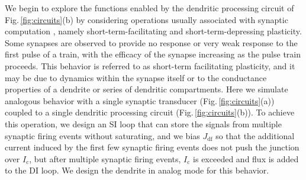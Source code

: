 \documentclass[twocolumn]{article}
\begin{document}
We begin to explore the functions enabled by the dendritic processing circuit of Fig.\,\ref{fig:circuits}(b) by considering operations usually associated with synaptic computation \cite{abre2004}, namely short-term-facilitating and short-term-depressing plasticity. Some synapses are observed to provide no response or very weak response to the first pulse of a train, with the efficacy of the synapse increasing as the pulse train proceeds. This behavior is referred to as short-term facilitating plasticity, and it may be due to dynamics within the synapse itself or to the conductance properties of a dendrite or series of dendritic compartments. Here we simulate analogous behavior with a single synaptic transducer (Fig.\,\ref{fig:circuits}(a)) coupled to a single dendritic processing circuit (Fig.\,\ref{fig:circuits}(b)). To achieve this operation, we design an SI loop that can store the signals from multiple synaptic firing events without saturating, and we bias $J_{\mathrm{df}}$ so that the additional current induced by the first few synaptic firing events does not push the junction over $I_{\mathrm{c}}$, but after multiple synaptic firing events, $I_{\mathrm{c}}$ is exceeded and flux is added to the DI loop. We design the dendrite in analog mode for this behavior.
\end{document}
